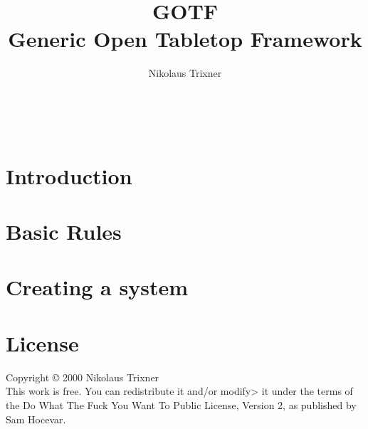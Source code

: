 \documentclass{article}
\begin{document}
	\title{GOTF \\ Generic Open Tabletop Framework}
	\
	\author{Nikolaus Trixner}
		
	\maketitle
	
	\tableofcontents

\part{Introduction}\label{part:intrudction}
	
	
	


\part{Basic Rules}\label{part:basicRules}
	

\part{Creating a system}\label{part:systemCreation}
	


\part{License}\label{part:license}
	Copyright © 2000 Nikolaus Trixner\\
	This work is free.
	You can redistribute it and/or modify> it under the  terms of the Do What The Fuck You Want To Public License, Version 2, as published by Sam Hocevar.
\end{document}
